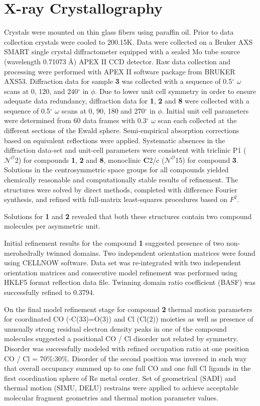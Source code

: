 \section{X-ray Crystallography}\label{sec.xray}
Crystals were mounted on thin glass fibers using paraffin oil. Prior to data collection crystals were cooled to 200.15K. Data were collected on a Bruker AXS SMART single crystal diffractometer equipped with a sealed Mo tube source (wavelength 0.71073 \r{A}) APEX II CCD detector. Raw data collection and processing were performed with APEX II software package from BRUKER AXS53\autocite{apex}. Diffraction data for sample \textbf{3} was collected with a sequence of 0.5$^\circ$ $\omega$ scans at 0, 120, and 240$^\circ$ in $\phi$. Due to lower unit cell symmetry in order to ensure adequate data redundancy, diffraction data for \textbf{1}, \textbf{2} and \textbf{8} were collected with a sequence of 0.5$^\circ$ $\omega$ scans at 0, 90, 180 and 270$^\circ$ in $\phi$. Initial unit cell parameters were determined from 60 data frames with 0.3$^\circ$ $\omega$ scan each collected at the different sections of the Ewald sphere. Semi-empirical absorption corrections based on equivalent reflections were applied\autocite{blessing1995}. Systematic absences in the diffraction data-set and unit-cell parameters were consistent with triclinic P$\overline{1}$ ($\mathcal{N} ^\mathcal{O}$2) for compounds \textbf{1}, \textbf{2} and \textbf{8}, monoclinic \textbf{C}2/c ($\mathcal{N} ^\mathcal{O}$15) for compound \textbf{3}. Solutions in the centrosymmetric space groups for all compounds yielded chemically reasonable and computationally stable results of refinement. The structures were solved by direct methods, completed with difference Fourier synthesis, and refined with full-matrix least-squares procedures based on $F^2$.

Solutions for \textbf{1} and \textbf{2} revealed that both these structures contain two compound molecules per asymmetric unit.

Initial refinement results for the compound \textbf{1} suggested presence of two non-merohedrally twinned domains. Two independent orientation matrices were found using CELL\textunderscore NOW software\autocite{cellnow}. Data set was re-integrated with two independent orientation matrices and consecutive model refinement was performed using HKLF5 format reflection data file. Twinning domain ratio coefficient (BASF) was successfully refined to 0.3794.

On the final model refinement stage for compound \textbf{2} thermal motion parameters for coordinated CO (-C(33)=O(3)) and Cl (Cl(2)) moieties as well as presence of unusually strong residual electron density peaks in one of the compound molecules suggested a positional CO / Cl disorder not related by symmetry. Disorder was successfully modeled with refined occupation ratio at one position CO / Cl = 70\%:30\%. Disorder of the second position was inversed in such way that overall occupancy summed up to one full CO and one full Cl ligands in the first coordination sphere of Re metal center. Set of geometrical (SADI) and thermal motion (SIMU, DELU) restrains were applied to achieve acceptable molecular fragment geometries and thermal motion parameter values.

